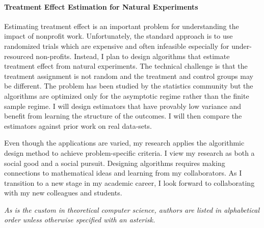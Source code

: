 \documentclass[11pt]{article}
\begin{document}
\paragraph{Treatment Effect Estimation for Natural Experiments}
Estimating treatment effect is an important problem for understanding the impact of nonprofit work.
Unfortunately, the standard approach is to use randomized trials which are expensive and often infeasible especially for under-resourced non-profits.
Instead, I plan to design algorithms that estimate treatment effect from natural experiments.
The technical challenge is that the treatment assignment is not random and the treatment and control groups may be different.
The problem has been studied by the statistics community but the algorithms are optimized only for the asymptotic regime rather than the finite sample regime.
I will design estimators that have provably low variance and benefit from learning the structure of the outcomes.
I will then compare the estimators against prior work on real data-sets.


\noindent Even though the applications are varied, my research applies the algorithmic design method to achieve problem-specific criteria.
I view my research as both a social good and a social pursuit.
Designing algorithms requires making connections to mathematical ideas and learning from my collaborators.
As I transition to a new stage in my academic career,
I look forward to collaborating with my new colleagues and students.


	
\textit{As is the custom in theoretical computer science, authors are listed in alphabetical order unless otherwise specified with an asterisk.}
\end{document}
